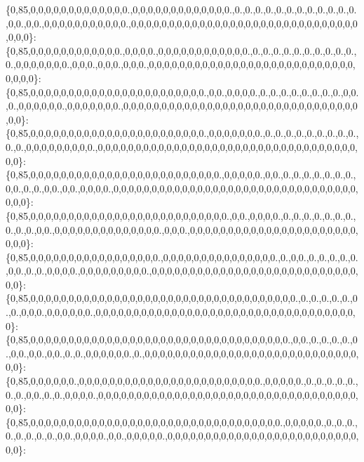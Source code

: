 \{0,85,0,0,0,0,0,0,0,0,0,0,0,0,0.,0,0,0,0,0,0,0,0,0,0,0,0,0.,0.,0.,0.,0.,0.,0.,0.,0.,0.,0.,0.,0.,0,0.,0,0.,0,0,0,0,0,0,0,0,0,0,0.,0,0,0,0,0,0,0,0,0,0,0,0,0,0,0,0,0,0,0,0,0,0,0,0,0,0,0,0,0,0,0,0,0\}\+: \{0,85,0,0,0,0,0,0,0,0,0,0,0,0.,0,0,0,0.,0,0,0,0,0,0,0,0,0,0,0,0.,0.,0.,0.,0.,0.,0.,0.,0.,0.,0.,0.,0,0,0,0,0,0,0.,0,0,0.,0,0,0.,0,0,0.,0,0,0,0,0,0,0,0,0,0,0,0,0,0,0,0,0,0,0,0,0,0,0,0,0,0,0,0,0,0,0\}\+: \{0,85,0,0,0,0,0,0,0,0,0,0,0,0,0,0,0,0,0,0,0,0,0,0,0.,0,0.,0,0,0,0.,0.,0.,0.,0.,0.,0.,0.,0.,0,0.,0.,0,0,0,0,0,0.,0,0,0,0,0,0,0.,0,0,0,0,0,0,0,0,0,0,0,0,0,0,0,0,0,0,0,0,0,0,0,0,0,0,0,0,0,0,0,0,0\}\+: \{0,85,0,0,0,0,0,0,0,0,0,0,0,0,0,0,0,0,0,0,0,0,0,0,0.,0,0,0,0,0,0,0.,0.,0.,0.,0.,0.,0.,0.,0.,0.,0.,0.,0,0,0,0,0,0,0,0,0.,0,0,0,0,0,0,0,0,0,0,0,0,0,0,0,0,0,0,0,0,0,0,0,0,0,0,0,0,0,0,0,0,0,0,0,0\}\+: \{0,85,0,0,0,0,0,0,0,0,0,0,0,0,0,0,0,0,0,0,0,0,0,0,0,0,0.,0,0,0,0,0.,0,0.,0.,0.,0.,0.,0.,0.,0.,0,0.,0.,0.,0,0.,0,0.,0,0,0,0.,0,0,0,0,0,0,0,0,0,0,0,0,0,0,0,0,0,0,0,0,0,0,0,0,0,0,0,0,0,0,0,0,0,0,0\}\+: \{0,85,0,0,0,0,0,0,0,0,0,0,0,0,0,0,0,0,0,0,0,0,0,0,0,0,0,0.,0,0.,0,0,0,0.,0.,0.,0.,0.,0.,0.,0.,0.,0.,0.,0,0.,0,0,0,0,0,0,0,0,0,0,0,0,0,0.,0,0,0.,0,0,0,0,0,0,0,0,0,0,0,0,0,0,0,0,0,0,0,0,0,0,0,0,0\}\+: \{0,85,0,0,0,0,0,0,0,0,0,0,0,0,0,0,0,0,0.,0,0,0,0,0,0,0,0,0,0,0,0,0,0,0.,0.,0,0.,0.,0.,0.,0.,0.,0,0.,0.,0.,0,0,0,0.,0,0,0,0,0,0,0,0,0.,0,0,0,0,0,0,0,0,0,0,0,0,0,0,0,0,0,0,0,0,0,0,0,0,0,0,0,0,0\}\+: \{0,85,0,0,0,0,0,0,0,0,0,0,0,0,0,0,0,0,0,0,0,0,0,0,0,0,0,0,0,0,0,0,0,0,0,0,0.,0.,0.,0.,0.,0.,0.,0.,0,0,0.,0,0,0,0,0,0.,0,0,0,0,0,0,0,0,0,0,0,0,0,0,0,0,0,0,0,0,0,0,0,0,0,0,0,0,0,0,0,0,0,0,0\}\+: \{0,85,0,0,0,0,0,0,0,0,0,0,0,0,0,0,0,0,0,0,0,0,0,0,0,0,0,0,0,0,0,0,0,0,0,0.,0,0.,0.,0.,0.,0.,0.,0,0.,0,0.,0,0.,0.,0.,0,0,0,0,0,0.,0.,0,0,0,0,0,0,0,0,0,0,0,0,0,0,0,0,0,0,0,0,0,0,0,0,0,0,0,0,0,0\}\+: \{0,85,0,0,0,0,0,0.,0,0,0,0,0,0,0,0,0,0,0,0,0,0,0,0,0,0,0,0,0,0,0,0.,0,0,0,0,0.,0.,0.,0.,0.,0.,0.,0.,0,0.,0.,0.,0,0,0,0.,0,0,0,0,0,0,0,0,0,0,0,0,0,0,0,0,0,0,0,0,0,0,0,0,0,0,0,0,0,0,0,0,0,0,0,0\}\+: \{0,85,0,0,0,0,0,0,0,0,0,0,0,0,0,0,0,0,0,0,0,0,0,0,0,0,0,0,0,0,0,0,0,0,0.,0,0,0,0,0.,0.,0.,0.,0.,0.,0.,0.,0.,0,0.,0,0,0,0.,0,0.,0,0,0,0,0.,0,0,0,0,0,0,0,0,0,0,0,0,0,0,0,0,0,0,0,0,0,0,0,0,0,0,0\}\+: 